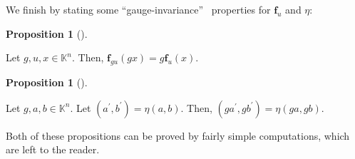 \documentclass[numbers=enddot,12pt,final,onecolumn,notitlepage]{scrartcl}%
\theoremstyle{definition}
\newtheorem{prop}[theo]{Proposition}
\newenvironment{proposition}[1][]
{\begin{prop}[#1]\begin{leftbar}}
{\end{leftbar}\end{prop}}
\newenvironment{vershort}{}{}
\begin{document}
We finish by stating some \textquotedblleft gauge-invariance\textquotedblright%
\ properties for $\mathbf{f}_{u}$ and $\eta$:

\begin{proposition}
\label{prop.fu-gauge}Let $g,u,x\in\mathbb{K}^{n}$. Then, $\mathbf{f}%
_{gu}\left(  gx\right)  =g\mathbf{f}_{u}\left(  x\right)  $.
\end{proposition}

\begin{proposition}
\label{prop.eta-gauge}Let $g,a,b\in\mathbb{K}^{n}$. Let $\left(  a^{\prime
},b^{\prime}\right)  =\eta\left(  a,b\right)  $. Then, $\left(  ga^{\prime
},gb^{\prime}\right)  =\eta\left(  ga,gb\right)  $.
\end{proposition}

\begin{vershort}
Both of these propositions can be proved by fairly simple computations, which
are left to the reader.
\end{vershort}
\end{document}
